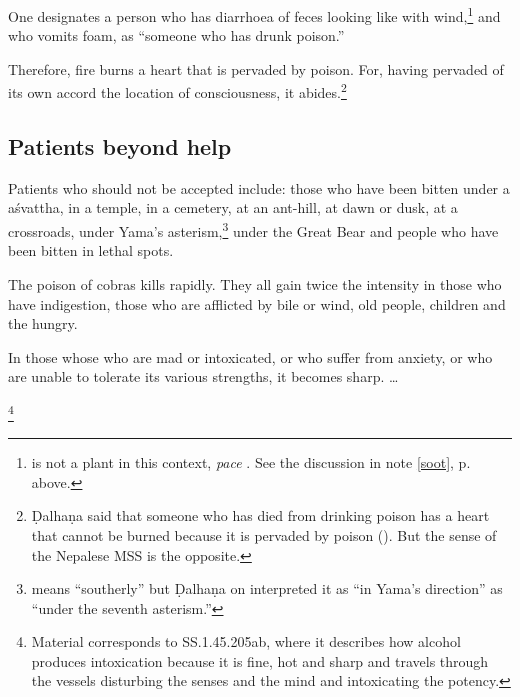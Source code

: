 \begin{translation}[resume]
  \item
  [35cd \& 36cd] 
  
One designates a person who has diarrhoea of feces looking like
 with wind,\footnote{ is not a plant
    in this context, \emph{pace} \cite[362]{moni-sans}. See the discussion
    in note \ref{soot}, p.\,\pageref{soot} above.\label{grhadhuma}} and who
    vomits foam, as “someone who has drunk poison.” \item[37]  Therefore,
    fire burns a  heart that is  pervaded by poison. For, having pervaded
    of its own accord  the location of consciousness, it
    abides.\footnote{Ḍalhaṇa said that someone who has died from drinking
        poison has a heart that cannot be burned because it is pervaded by
        poison (). But the sense of the Nepalese MSS is the
        opposite.}
 
 \subsection{Patients beyond help}  
 
 \item[38] 

Patients who should not be accepted include: those who have been
bitten under a \gls{aśvattha}, in a temple, in a cemetery, at an
ant-hill, at dawn or dusk, at a crossroads, under Yama's
asterism,\footnote{ means “southerly” but Ḍalhaṇa on
     interpreted it as “in
    Yama's direction” as “under the seventh asterism.”} under the Great
    Bear and people who have been bitten in lethal spots.
 
 \item[39]  
 
The poison of cobras kills rapidly.  They all gain twice the intensity
in those who have indigestion, those who are afflicted by bile or
wind, old people, children and the hungry.
 
 
 \item[39.1]  
 
In those whose who are mad or intoxicated, or who suffer from anxiety,
or who are unable to tolerate its various strengths, it becomes sharp.
\dag \ldots
 
 \item[39.2] 
 
 
 \footnote{Material corresponds to SS.1.45.205ab, where it  
 describes how alcohol produces intoxication because it is fine, hot  
 and sharp and travels through the vessels disturbing the senses and  
 the mind and intoxicating the potency.}  
 

\end{translation}

